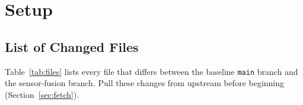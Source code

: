 \documentclass[12pt,letterpaper]{article}
\begin{document}
% 
\newpage

\section{Setup}

\subsection{List of Changed Files}

Table~\ref{tab:files} lists every file that differs between the baseline
\texttt{main} branch and the sensor-fusion branch.
Pull these changes from upstream before beginning (Section~\ref{sec:fetch}).
\end{document}
